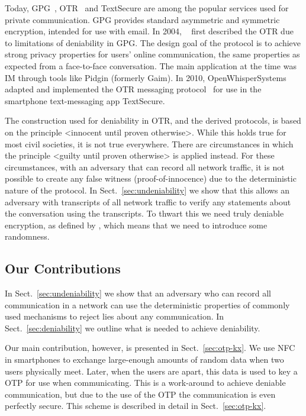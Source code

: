 Today, \ac{GPG}~\cite{gpg}, \ac{OTR}~\cite{otr} and TextSecure 
\cite{textsecure} are among the popular services used for private 
communication.
\ac{GPG} provides standard asymmetric and symmetric encryption, intended for 
use with email.
In 2004, \citeauthor{otr2004}~\cite{otr2004} first described the \ac{OTR} due 
to limitations of deniability in \ac{GPG}.
The design goal of the protocol is to achieve strong privacy properties for 
users' online communication, the same properties as expected from 
a face-to-face conversation.
The main application at the time was \ac{IM} through tools like Pidgin 
\cite{pidgin} (formerly Gaim).
In 2010, OpenWhisperSystems adapted and implemented the \ac{OTR} messaging 
protocol~\cite{frosch2014secure} for use in the smartphone text-messaging app 
TextSecure.

The construction used for deniability in \ac{OTR}, and the derived protocols, 
is based on the principle <innocent until proven otherwise>.
While this holds true for most civil societies, it is not true everywhere.
There are circumstances in which the principle <guilty until proven otherwise> 
is applied instead.
For these circumstances, with an adversary that can record all network traffic, 
it is not possible to create any false witness (proof-of-innocence) due to the 
deterministic nature of the protocol.
In Sect.~\ref{sec:undeniability} we show that this allows an adversary with 
transcripts of all network traffic to verify any statements about the 
conversation using the transcripts.
To thwart this we need truly deniable encryption, as defined by 
\citet{deniablecrypt}, which means that we need to introduce some randomness.

\subsection{Our Contributions}

In Sect.~\ref{sec:undeniability} we show that an adversary who can record all 
communication in a network can use the deterministic properties of commonly 
used mechanisms to reject lies about any communication.
In Sect.~\ref{sec:deniability} we outline what is needed to achieve 
deniability.

Our main contribution, however, is presented in Sect.~\ref{sec:otp-kx}.
We use \ac{NFC} in smartphones to exchange large-enough amounts of random data 
when two users physically meet.
Later, when the users are apart, this data is used to key a \ac{OTP} for use 
when communicating.
This is a work-around to achieve deniable communication, but due to the use of 
the \ac{OTP} the communication is even perfectly secure.
This scheme is described in detail in Sect.~\ref{sec:otp-kx}.

